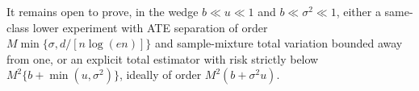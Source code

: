 It remains open to prove, in the wedge \(b\ll u\ll1\) and \(b\ll\sigma^2\ll1\), either a same-class lower experiment with ATE separation of order \(M\min\{\sigma,d/[n\log(en)]\}\) and sample-mixture total variation bounded away from one, or an explicit total estimator with risk strictly below \(M^2\{b+\min(u,\sigma^2)\}\), ideally of order \(M^2(b+\sigma^2u)\).